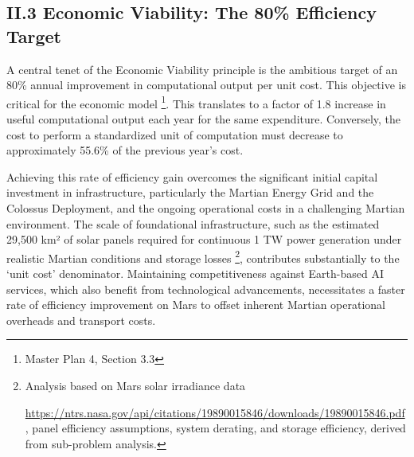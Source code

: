 \documentclass[fontsize=10pt, oneside, DIV=calc]{scrartcl}
\begin{document}
\subsection*{II.3 Economic Viability: The 80\% Efficiency Target}



\medskip

\noindent
A central tenet of the Economic Viability principle is the ambitious target of an 80\% annual improvement in computational output per unit cost. This objective is critical for the economic model \footnote{Master Plan 4, Section 3.3}. This translates to a factor of 1.8 increase in useful computational output each year for the same expenditure. Conversely, the cost to perform a standardized unit of computation must decrease to approximately 55.6\% of the previous year's cost.

\medskip

\noindent
Achieving this rate of efficiency gain overcomes the significant initial capital investment in infrastructure, particularly the Martian Energy Grid and the Colossus Deployment, and the ongoing operational costs in a challenging Martian environment. The scale of foundational infrastructure, such as the estimated 29,500 km² of solar panels required for continuous 1 TW power generation under realistic Martian conditions and storage losses \footnote{Analysis based on Mars solar irradiance data








\href{https://ntrs.nasa.gov/api/citations/19890015846/downloads/19890015846.pdf}\url{https://ntrs.nasa.gov/api/citations/19890015846/downloads/19890015846.pdf}, panel efficiency assumptions, system derating, and storage efficiency, derived from sub-problem analysis.}, contributes substantially to the `unit cost' denominator. Maintaining competitiveness against Earth-based AI services, which also benefit from technological advancements, necessitates a faster rate of efficiency improvement on Mars to offset inherent Martian operational overheads and transport costs.

\medskip
\end{document}
